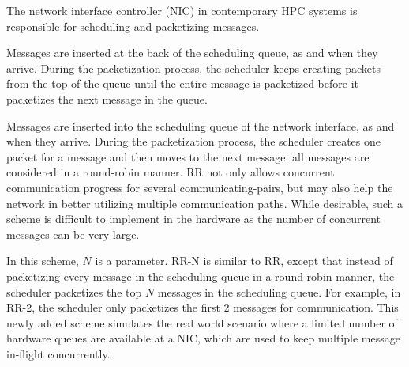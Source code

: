
The network interface controller (NIC) in contemporary HPC systems is
responsible for scheduling and packetizing messages.

\vspace{0.08in}
Messages are inserted
at the back of the scheduling queue, as and when they arrive.
During the packetization process, %
the scheduler keeps creating packets from the top of the queue until
the entire message is packetized before it packetizes the next message in the queue. 

\vspace{0.08in}
 Messages are inserted into the scheduling queue of
the network interface, as and when they arrive. During the packetization process,
the scheduler creates one packet for a message and then moves to the next message:
all messages are considered in a round-robin manner. 
RR not only allows concurrent communication
progress for several communicating-pairs, but may also help the network in
better utilizing multiple communication paths. While desirable, such a scheme is
difficult to implement in the hardware as the number of concurrent messages can
be very large.

\vspace{0.08in}

\vspace{0.08in}
 In this scheme, $N$ is a parameter. RR-N is similar to RR,
except that instead of packetizing every message in the scheduling queue in
a round-robin manner,
the scheduler packetizes the top $N$ messages in the scheduling queue. For example,
in RR-2, the scheduler only packetizes the first 2 messages for communication.
This newly added scheme simulates the real world scenario where a limited
number of hardware queues are available at a NIC, which are used to keep
multiple message in-flight concurrently.

